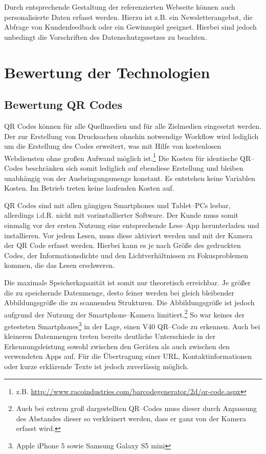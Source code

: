 Durch entsprechende Gestaltung der referenzierten Webseite können auch personalisierte Daten erfasst werden. Hierzu ist z.B. ein Newsletterangebot, die Abfrage von Kundenfeedback oder ein Gewinnspiel geeignet. Hierbei sind jedoch unbedingt die Vorschriften des Datenschutzgesetzes zu beachten.


\newpage
\section{Bewertung der Technologien} %
\label{sec:bewertung}

\subsection{Bewertung QR Codes} %
\label{sub:bewertung_qr_codes}
QR Codes können für alle Quellmedien und für alle Zielmedien eingesetzt werden. Der zur Erstellung von Drucksachen ohnehin notwendige Workflow wird lediglich um die Erstellung des Codes erweitert, was mit Hilfe von kostenlosen Webdiensten ohne großen Aufwand möglich ist.\footnote{z.B. \url{http://www.racoindustries.com/barcodegenerator/2d/qr-code.aspx}} Die Kosten für identische QR–Codes beschränken sich somit lediglich auf ebendiese Erstellung und bleiben unabhängig von der Ausbringungsmenge konstant. Es entstehen keine Variablen Kosten. Im Betrieb treten keine laufenden Kosten auf.

QR Codes sind mit allen gängigen Smartphones und Tablet–PCs lesbar, allerdings i.d.R. nicht mit vorinstallierter Software. Der Kunde muss somit einmalig vor der ersten Nutzung eine entsprechende Lese–App herunterladen und installieren. Vor jedem Lesen, muss diese aktiviert werden und mit der Kamera der QR Code erfasst werden. Hierbei kann es je nach Größe des gedruckten Codes, der Informationsdichte und den Lichtverhältnissen zu Fokusproblemen kommen, die das Lesen erschweren.   

Die maximale Speicherkapazität ist somit nur theoretisch erreichbar. Je größer die zu speichernde Datenmenge, desto feiner werden bei gleich bleibender Abbildungsgröße die zu scannenden Strukturen. Die Abbildungsgröße ist jedoch aufgrund der Nutzung der Smartphone–Kamera limitiert.\footnote{Auch bei extrem groß dargestellten QR–Codes muss dieser durch Anpassung des Abstandes dieser so verkleinert werden, dass er ganz von der Kamera erfasst wird.} So war keines der getesteten Smartphones\footnote{Apple iPhone 5 sowie Samsung Galaxy S5 mini} in der Lage, einen V40 QR–Code zu erkennen. Auch bei kleineren Datenmengen treten bereits deutliche Unterschiede in der Erkennungsleistung sowohl zwischen den Geräten als auch zwischen den verwendeten Apps auf. Für die Übertragung einer \ac{URL}, Kontaktinformationen oder kurze erklärende Texte ist jedoch zuverlässig möglich.

